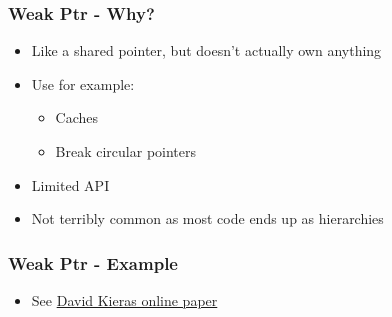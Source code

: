 \begin{Shaded}
\begin{Highlighting}[]
   
\NormalTok{\{}
\NormalTok{\}}
 
\NormalTok{\{}
\NormalTok{\}}
 
\NormalTok{\{}
   \NormalTok{,}\NormalTok{),}
                             \NormalTok{);}
\NormalTok{\}}
\end{Highlighting}
\end{Shaded}

\subsubsection{Weak Ptr - Why?}\label{weak-ptr---why}

\begin{itemize}
\itemsep1pt\parskip0pt
\item
  Like a shared pointer, but doesn't actually own anything
\item
  Use for example:

  \begin{itemize}
  \itemsep1pt\parskip0pt
  \item
    Caches
  \item
    Break circular pointers
  \end{itemize}
\item
  Limited API
\item
  Not terribly common as most code ends up as hierarchies
\end{itemize}

\subsubsection{Weak Ptr - Example}\label{weak-ptr---example}

\begin{itemize}
\itemsep1pt\parskip0pt
\item
  See
  \href{http://www.umich.edu/~eecs381/handouts/C++11_smart_ptrs.pdf}{David
  Kieras online paper}
\end{itemize}

